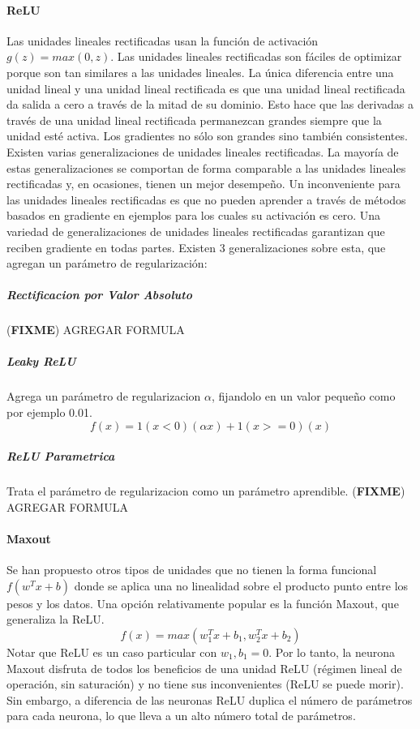 \documentclass[a4paper,11pt,spanish]{book}
\newcommand*{\FIXME}[1]{{(\textbf{FIXME}) {#1}}}
\begin{document}
	\paragraph{ReLU} Las unidades lineales rectificadas usan la función de activación $g(z) = max(0,z)$.
	Las unidades lineales rectificadas son fáciles de optimizar porque son tan similares a las unidades lineales.
	La única diferencia entre una unidad lineal y una unidad lineal rectificada es que una unidad lineal rectificada da salida a cero a través de la mitad de su dominio.
	Esto hace que las derivadas a través de una unidad lineal rectificada permanezcan grandes siempre que la unidad esté activa.
	Los gradientes no sólo son grandes sino también consistentes.\\
	Existen varias generalizaciones de unidades lineales rectificadas. La mayoría de estas generalizaciones se comportan de forma comparable a las unidades lineales rectificadas
	y, en ocasiones, tienen un mejor desempeño. Un inconveniente para las unidades lineales rectificadas es que no pueden aprender a través de métodos basados ​​en
	gradiente en ejemplos para los cuales su activación es cero. Una variedad de generalizaciones de unidades lineales rectificadas garantizan que reciben gradiente en
	todas partes. Existen 3 generalizaciones sobre esta, que agregan un parámetro de regularización:
	  \subparagraph{Rectificacion por Valor Absoluto} \FIXME{AGREGAR FORMULA}
	  \subparagraph{Leaky ReLU} Agrega un parámetro de regularizacion $\alpha$, fijandolo en un valor pequeño como por ejemplo 0.01.
	    \begin{equation}
	     f(x)=1(x<0)(\alpha x)+1(x>=0)(x)
	    \end{equation}

	  \subparagraph{ReLU Parametrica} Trata el parámetro de regularizacion como un parámetro aprendible. \FIXME{AGREGAR FORMULA}
	\paragraph{Maxout}
	  Se han propuesto otros tipos de unidades que no tienen la forma funcional $f(w^T x + b)$ donde se aplica una no linealidad sobre el producto punto entre los pesos y los datos.
	  Una opción relativamente popular es la función Maxout, que generaliza la ReLU.
	  \begin{equation}
	   f(x) = max(w_1^T x+b_1,w_2^T x+b_2)
	  \end{equation}
	  Notar que ReLU es un caso particular con $w_1, b_1 = 0$. Por lo tanto, la neurona Maxout disfruta de todos los beneficios de una unidad ReLU (régimen lineal de operación, sin saturación)
	  y no tiene sus inconvenientes (ReLU se puede morir). Sin embargo, a diferencia de las neuronas ReLU duplica el número de parámetros para cada neurona,
	  lo que lleva a un alto número total de parámetros.
\end{document}
